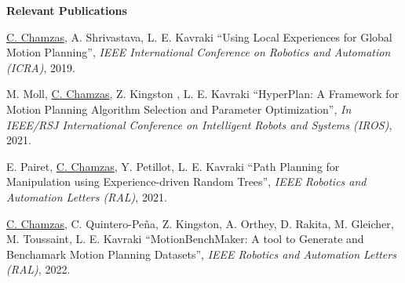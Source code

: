 \documentclass[letterpaper,11pt]{article}
\newcommand{\resheading}[1]{{\large \colorbox{mygrey}{\begin{minipage}{\textwidth}{\textbf{#1 \vphantom{p\^{E}}}}\end{minipage}}}}
\begin{document}
\resheading{Relevant Publications }
\begingroup
\renewcommand{\section}[2]{}%
\begin{thebibliography}{4}
	
	\underline{C. Chamzas}, A. Shrivastava, L. E. Kavraki
	``Using Local Experiences for Global Motion Planning'',
	\textit{IEEE International Conference on Robotics and Automation (ICRA)}, 2019.
	
	
	M. Moll, \underline{C. Chamzas}, Z. Kingston , L. E. Kavraki
	``HyperPlan: A Framework for Motion Planning Algorithm Selection and Parameter Optimization'',
	\textit{In IEEE/RSJ International Conference on Intelligent Robots and Systems (IROS)}, 2021.  
	
	E. Pairet, \underline{C. Chamzas}, Y. Petillot, L. E. Kavraki
	``Path Planning for Manipulation using Experience-driven Random Trees'',
	\textit{IEEE Robotics and Automation Letters (RAL)}, 2021.
	
	
	\underline{C. Chamzas}, C. Quintero-Peña, Z. Kingston, A. Orthey, D. Rakita, M. Gleicher, M. Toussaint, L. E. Kavraki      ``MotionBenchMaker: A tool to Generate and Benchamark Motion Planning Datasets'',
	\textit{IEEE Robotics and Automation Letters (RAL)}, 2022.  
	


	
\end{thebibliography}
\endgroup

\end{document}
